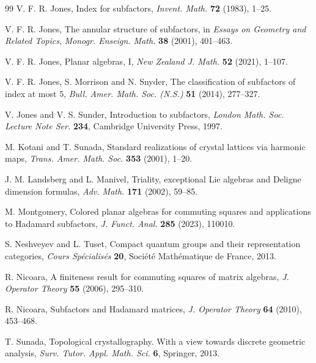 \documentclass[11pt,reqno]{amsart}
\theoremstyle{definition}
\numberwithin{equation}{section}
\begin{document}
\begin{thebibliography}{99}
V. F. R. Jones, Index for subfactors, {\em Invent. Math.} {\bf 72} (1983), 1--25.

V. F. R. Jones, The annular structure of subfactors, in {\em Essays on Geometry and Related Topics}, {\em Monogr. Enseign. Math.} {\bf 38} (2001), 401--463.

V. F. R. Jones, Planar algebras, I, {\em New Zealand J. Math.} {\bf 52} (2021), 1--107.

V. F. R. Jones, S. Morrison and N. Snyder, The classification of subfactors of index at most $5$, {\em Bull. Amer. Math. Soc. (N.S.)} {\bf 51} (2014), 277--327.

V. Jones and V. S. Sunder, Introduction to subfactors, {\em London Math. Soc. Lecture Note Ser.} {\bf 234}, Cambridge University Press, 1997.

M. Kotani and T. Sunada, Standard realizations of crystal lattices via harmonic maps, {\em Trans. Amer. Math. Soc.} {\bf 353} (2001), 1--20.

J. M. Landsberg and L. Manivel, Triality, exceptional Lie algebras and Deligne dimension formulas, {\em Adv. Math.} {\bf 171} (2002), 59--85.

M. Montgomery, Colored planar algebras for commuting squares and applications to Hadamard subfactors, {\em J. Funct. Anal.} {\bf 285} (2023), 110010.

S. Neshveyev and L. Tuset, Compact quantum groups and their representation categories, {\em Cours Sp\'ecialis\'es} {\bf 20}, Soci\'et\'e Math\'ematique de France, 2013.

R. Nicoara, A finiteness result for commuting squares of matrix algebras, {\em J. Operator Theory} {\bf 55} (2006), 295--310.

R. Nicoara, Subfactors and Hadamard matrices, {\em J. Operator Theory} {\bf 64} (2010), 453--468.

T. Sunada, Topological crystallography. With a view towards discrete geometric analysis, {\em Surv. Tutor. Appl. Math. Sci.} {\bf 6}, Springer, 2013.

\end{thebibliography}
\end{document}
